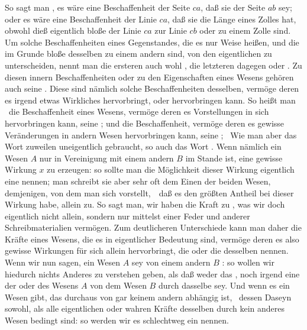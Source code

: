 \begin{aufza}
So sagt man \zB , es wäre eine Beschaffenheit der Seite $ca$, daß sie der Seite $ab$  sey; oder es wäre eine Beschaffenheit der Linie $ca$, daß sie die Länge eines Zolles hat, obwohl dieß eigentlich bloße  der Linie $ca$ zur Linie $cb$ oder zu einem Zolle sind. Um solche Beschaffenheiten eines Gegenstandes, die es nur  Weise heißen, und die im Grunde bloße  desselben zu einem andern sind, von den eigentlichen zu unterscheiden, nennt man die ersteren auch wohl , die letzteren dagegen  oder . Zu diesen innern Beschaffenheiten oder zu den Eigenschaften eines Wesens gehören auch seine . Diese sind nämlich solche Beschaffenheiten desselben, vermöge deren es irgend etwas Wirkliches hervorbringt, oder hervorbringen kann. So heißt man \zB\ die Beschaffenheit eines Wesens, vermöge deren es Vorstellungen in sich hervorbringen kann, seine ; und die Beschaffenheit, vermöge deren es gewisse Veränderungen in andern Wesen hervorbringen kann, seine ; \usw\ Wie man aber das Wort  zuweilen uneigentlich gebraucht, so auch das Wort . Wenn nämlich ein Wesen $A$ nur in Vereinigung mit einem andern $B$ im Stande ist, eine gewisse Wirkung $x$ zu erzeugen: so sollte man die Möglichkeit dieser Wirkung eigentlich eine  nennen; man schreibt sie aber sehr oft dem Einen der beiden Wesen, demjenigen, von dem man sich vorstellt,~\ daß es den größten Antheil bei dieser Wirkung habe, allein zu. So sagt man, wir haben die Kraft zu , was wir doch eigentlich nicht allein, sondern nur mittelst einer Feder und anderer Schreibmaterialien vermögen. Zum deutlicheren Unterschiede kann man daher die Kräfte eines Wesens, die es in eigentlicher Bedeutung sind, vermöge deren es also gewisse Wirkungen für sich allein hervorbringt, die  oder die  desselben nennen. Wenn wir nun sagen, ein Wesen $A$ sey von einem andern $B$ : so wollen wir hiedurch nichts Anderes zu verstehen geben, als daß weder das , noch irgend eine der  oder  des Wesens $A$ von dem Wesen $B$  durch dasselbe sey. Und wenn es ein Wesen gibt, das durchaus von gar keinem andern abhängig ist, \dh\ dessen Daseyn sowohl, als alle eigentlichen oder wahren Kräfte desselben durch kein anderes Wesen bedingt sind: so werden wir es schlechtweg ein  nennen.

\end{aufza}
